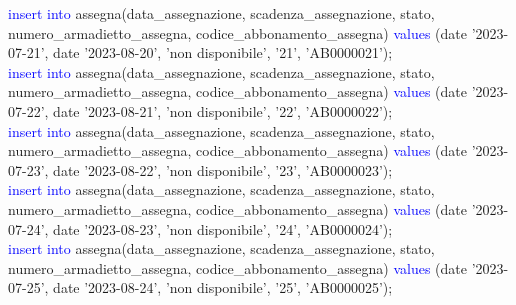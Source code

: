 \documentclass{article}
\begin{document}
\begin{flushleft}
{        \vspace{2mm}
        \hspace*{0.5em}\textcolor{blue}{insert into} assegna(data\_assegnazione, scadenza\_assegnazione, stato, \hspace*{0.5em}numero\_armadietto\_assegna, codice\_abbonamento\_assegna) \textcolor{blue}{values} \hspace*{0.5em}(date \hspace*{0.5em}'2023-07-21', date '2023-08-20', 'non disponibile', '21', 'AB0000021'); \\
        \vspace{2mm}
        \hspace*{0.5em}\textcolor{blue}{insert into} assegna(data\_assegnazione, scadenza\_assegnazione, stato, \hspace*{0.5em}numero\_armadietto\_assegna, codice\_abbonamento\_assegna) \textcolor{blue}{values} \hspace*{0.5em}(date \hspace*{0.5em}'2023-07-22', date '2023-08-21', 'non disponibile', '22', 'AB0000022'); \\
        \vspace{2mm}
        \hspace*{0.5em}\textcolor{blue}{insert into} assegna(data\_assegnazione, scadenza\_assegnazione, stato, \hspace*{0.5em}numero\_armadietto\_assegna, codice\_abbonamento\_assegna) \textcolor{blue}{values} \hspace*{0.5em}(date \hspace*{0.5em}'2023-07-23', date '2023-08-22', 'non disponibile', '23', 'AB0000023'); \\
        \vspace{2mm}
        \hspace*{0.5em}\textcolor{blue}{insert into} assegna(data\_assegnazione, scadenza\_assegnazione, stato, \hspace*{0.5em}numero\_armadietto\_assegna, codice\_abbonamento\_assegna) \textcolor{blue}{values} \hspace*{0.5em}(date \hspace*{0.5em}'2023-07-24', date '2023-08-23', 'non disponibile', '24', 'AB0000024'); \\
        \vspace{2mm}
        \hspace*{0.5em}\textcolor{blue}{insert into} assegna(data\_assegnazione, scadenza\_assegnazione, stato, \hspace*{0.5em}numero\_armadietto\_assegna, codice\_abbonamento\_assegna) \textcolor{blue}{values} \hspace*{0.5em}(date \hspace*{0.5em}'2023-07-25', date '2023-08-24', 'non disponibile', '25', 'AB0000025'); \\
}
\end{flushleft}
\end{document}
